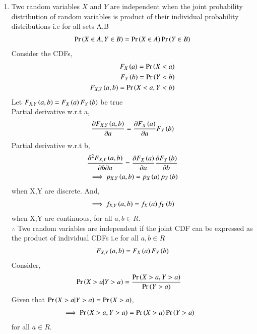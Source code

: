 \documentclass[journal,12pt,twocolumn]{IEEEtran}
\begin{document}
\begin{enumerate}
    \item Two random variables $X$ and $Y$ are independent when the joint probability distribution of random variables is product of their individual probability distributions i.e for all sets A,B
    \begin{align}
        \label{eq1} \Pr\left(X\in A,Y \in B\right)=\Pr\left(X \in A\right)\Pr\left(Y \in B\right)
    \end{align}
    Consider the CDFs,
    \begin{align}
        F_X\left(a\right)=\Pr\left(X<a\right)\\
        F_Y\left(b\right)=\Pr\left(Y<b\right)\\
        F_{X,Y}\left(a,b\right)=\Pr\left(X<a,Y<b\right)
    \end{align}
    Let $F_{X,Y}\left(a,b\right)=F_X\left(a\right)F_Y\left(b\right)$ be true\\
    Partial derivative w.r.t a,
    \begin{align}
        \frac{\partial F_{X,Y}\left(a,b\right)}{\partial a}=\frac{\partial F_X\left(a\right) }{\partial a}F_Y\left(b\right)
    \end{align}
    Partial derivative w.r.t b,
    \begin{align}
        \frac{\partial^2 F_{X,Y}\left(a,b\right)}{\partial b \partial a}=\frac{\partial F_X\left(a\right) }{\partial a}\frac{\partial F_Y\left(b\right) }{\partial b} \\
        \implies p_{X,Y}\left(a,b\right)=p_X\left(a\right)p_Y\left(b\right)
    \end{align}
    when X,Y are discrete. And,
    \begin{align}
        \implies f_{X,Y}\left(a,b\right)=f_X\left(a\right)f_Y\left(b\right)
    \end{align}
    when X,Y are continuous, for all $a,b\in R$. \\
    $\therefore$ Two random variables are independent if the joint CDF can be expressed as the product of individual CDFs i.e for all $a,b\in R$
    \begin{align}
       \label{eq1} F_{X,Y}\left(a,b\right)=F_X\left(a\right)F_Y\left(b\right)
    \end{align}
    Consider,
    \begin{align}
      \Pr\left(X>a|Y>a\right)&=\frac{\Pr\left(X>a,Y>a\right)}{\Pr\left(Y>a\right)}
    \end{align}
    Given that $\Pr\left(X>a|Y>a\right)=\Pr\left(X>a\right)$,
    \begin{align}
        \implies \Pr\left(X>a,Y>a\right)&=\Pr\left(X>a\right)\Pr\left(Y>a\right)
    \end{align}
    for all $a\in R$.
    \begin{multline}

\end{multline}
\end{enumerate}
\end{document}
